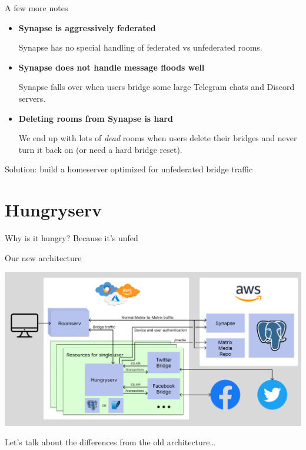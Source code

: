 \documentclass{beeper}
\begin{document}
\begin{frame}{A few more notes}
    \begin{itemize}[<+->]
        \item \textbf{Synapse is aggressively federated}

            Synapse has no special handling of federated vs unfederated rooms.

        \item \textbf{Synapse does not handle message floods well}

            Synapse falls over when users bridge some large Telegram chats and
            Discord servers.

        \item \textbf{Deleting rooms from Synapse is hard}

            We end up with lots of \textit{dead} rooms when users delete their
            bridges and never turn it back on (or need a hard bridge reset).
    \end{itemize}
\end{frame}

\begingroup
\def\insertframenumber{\relax}
\begin{frame}[standout]
    \Large
    Solution: build a homeserver optimized for unfederated bridge traffic
\end{frame}
\endgroup

\section{Hungryserv}

\begin{frame}{Why is it hungry?}
    \Large
    Because it's unfed
\end{frame}

\begin{frame}{Our new architecture}
    \centerline{\includegraphics[width=1.15\textwidth]{images/new-architecture}}

    Let's talk about the differences from the old architecture\ldots
\end{frame}
\end{document}
